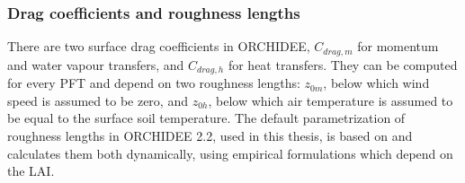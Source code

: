 


\hfill

\subsubsection*{Drag coefficients and roughness lengths}

There are two surface drag coefficients in ORCHIDEE, $C_{drag, m}$ for momentum and water vapour transfers, and $C_{drag, h}$ for heat transfers.
They can be computed for every PFT and depend on two roughness lengths: $z_{0m}$, below which wind speed is assumed to be zero, and $z_{0h}$, below which air temperature is assumed to be equal to the surface soil temperature. 
The default parametrization of roughness lengths in ORCHIDEE 2.2, used in this thesis, is based on \citet{su_evaluation_2001} and calculates them both dynamically, using empirical formulations which depend on the LAI. 


